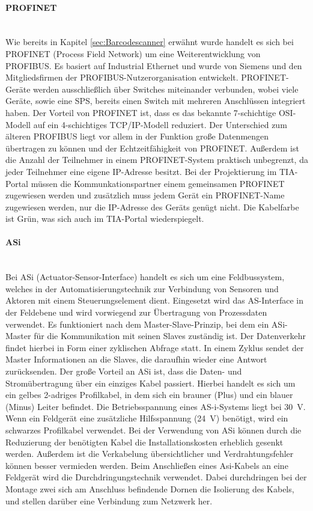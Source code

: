 \paragraph{PROFINET \cite{Profinet}}\mbox{}\\
Wie bereits in Kapitel \ref{sec:Barcodescanner} erwähnt wurde handelt es sich bei PROFINET (Process Field Network) um eine Weiterentwicklung von PROFIBUS. Es basiert auf Industrial Ethernet und wurde von Siemens und den Mitgliedsfirmen der PROFIBUS-Nutzerorganisation entwickelt. PROFINET-Geräte werden ausschließlich über Switches miteinander verbunden, wobei viele Geräte, sowie eine SPS, bereits einen Switch mit mehreren Anschlüssen integriert haben. Der Vorteil von PROFINET ist, dass es das bekannte 7-schichtige OSI-Modell auf ein 4-schichtiges TCP/IP-Modell reduziert. Der Unterschied zum älteren PROFIBUS liegt vor allem in der Funktion große Datenmengen übertragen zu können und der Echtzeitfähigkeit von PROFINET. Außerdem ist die Anzahl der Teilnehmer in einem PROFINET-System praktisch unbegrenzt, da jeder Teilnehmer eine eigene IP-Adresse besitzt. Bei der Projektierung im TIA-Portal müssen die Kommunkationspartner einem gemeinsamen PROFINET zugewiesen werden und zusätzlich muss jedem Gerät ein PROFINET-Name zugewiesen werden, nur die IP-Adresse des Geräts genügt nicht. Die Kabelfarbe ist Grün, was sich auch im TIA-Portal wiederspiegelt.

\paragraph{ASi \cite{ASi}}\mbox{}\\
Bei ASi (Actuator-Sensor-Interface) handelt es sich um eine Feldbussystem, welches in der Automatisierungstechnik zur Verbindung von Sensoren und Aktoren mit einem Steuerungselement dient. Eingesetzt wird das AS-Interface in der Feldebene und wird vorwiegend zur Übertragung von Prozessdaten verwendet. Es funktioniert nach dem Master-Slave-Prinzip, bei dem ein ASi-Master für die Kommunikation mit seinen Slaves zuständig ist. Der Datenverkehr findet hierbei in Form einer zyklischen Abfrage statt. In einem Zyklus sendet der Master Informationen an die Slaves, die daraufhin wieder eine Antwort zurücksenden. Der große Vorteil an ASi ist, dass die Daten- und Stromübertragung über ein einziges Kabel passiert. Hierbei handelt es sich um ein gelbes 2-adriges Profilkabel, in dem sich ein brauner (Plus) und ein blauer (Minus) Leiter befindet. Die Betriebsspannung eines AS-i-Systems liegt bei \qty{30}{\volt}. Wenn ein Feldgerät eine zusätzliche Hilfsspannung (\qty{24}{\volt}) benötigt, wird ein schwarzes Profilkabel verwendet. Bei der Verwendung von ASi können durch die Reduzierung der benötigten Kabel die Installationskosten erheblich gesenkt werden. Außerdem ist die Verkabelung übersichtlicher und Verdrahtungsfehler können besser vermieden werden. Beim Anschließen eines Asi-Kabels an eine Feldgerät wird die Durchdringungstechnik verwendet. Dabei durchdringen bei der Montage zwei sich am Anschluss befindende Dornen die Isolierung des Kabels, und stellen darüber eine Verbindung zum Netzwerk her.

